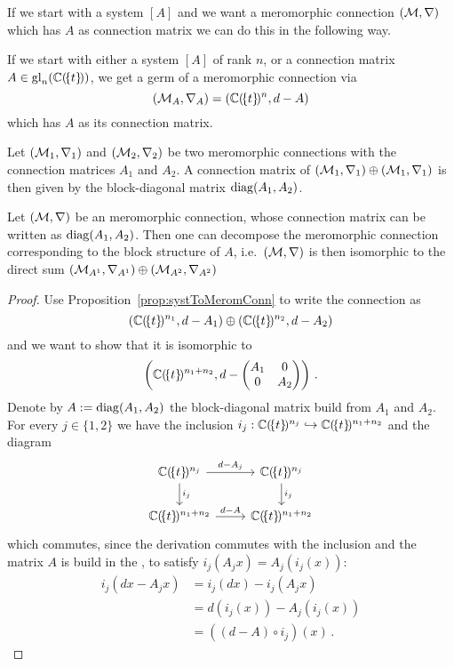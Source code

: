 If we start with a system $[A]$ and we want a meromorphic connection
$(\mathcal{M},\nabla)$ which has $A$ as connection matrix we can do this in the
following way.
\begin{prop}\label{prop:systToMeromConn}
  If we start with either a system $[A]$ of rank $n$, or a connection matrix
  $A\in\operatorname{gl}_n(\mathbb{C}(\!\{t\}\!))$, we get a germ of a meromorphic connection via
  \[
    (\mathcal{M}_A,\nabla_A)=(\mathbb{C}(\!\{t\}\!)^n,d-A)
  \]
  which has $A$ as its connection matrix.
\end{prop}

\begin{prop}\label{prop:MatOfSumOfMerCon}
  Let $(\mathcal{M}_1,\nabla_1)$ and $(\mathcal{M}_2,\nabla_2)$ be two meromorphic
  connections
  with the connection matrices $A_1$ and $A_2$.
  A connection matrix of $(\mathcal{M}_1,\nabla_1)\oplus(\mathcal{M}_1,\nabla_1)$ is then
  given
  by the block-diagonal matrix $\operatorname{diag}(A_1,A_2)$.
  \begin{s-cor}\label{cor:MatOfSumOfMerCon}
    Let $(\mathcal{M},\nabla)$ be an meromorphic connection, whose connection matrix
    can be written as $\operatorname{diag}(A_1,A_2)$.
    Then one can decompose the meromorphic connection corresponding to the block
    structure of $A$, i.e.\ $(\mathcal{M},\nabla)$ is then isomorphic to the direct sum
    $(\mathcal{M}_{A^1},\nabla_{A^1})\oplus(\mathcal{M}_{A^2},\nabla_{A^2})$
  \end{s-cor}
\end{prop}
\begin{proof}
  Use Proposition~\ref{prop:systToMeromConn} to write the connection as
  \[
    (\mathbb{C}(\!\{t\}\!)^{n_1},d-A_1)\oplus(\mathbb{C}(\!\{t\}\!)^{n_2},d-A_2)
  \]
  and we want to show that it is isomorphic to
  \[
    \left(\mathbb{C}(\!\{t\}\!)^{n_1+n_2},d-
    \begin{pmatrix} A_1 & 0 \\0 & A_2 \end{pmatrix}\right) \,.
  \]
  Denote by $A:=\operatorname{diag}(A_1,A_2)$ the block-diagonal matrix build from $A_1$ and
  $A_2$.
  For every $j\in\{1,2\}$ we have the inclusion
  $i_j:\mathbb{C}(\!\{t\}\!)^{n_j}\hookrightarrow\mathbb{C}(\!\{t\}\!)^{n_1+n_2}$ and the
  diagram
  \[ \begin{tikzcd}
      \C(\!\{t\}\!)^{n_j} \rar{d-A_j}\dar{i_j} & \C(\!\{t\}\!)^{n_j} \dar{i_j}
    \\\C(\!\{t\}\!)^{n_1+n_2} \rar{d-A} & \C(\!\{t\}\!)^{n_1+n_2}
  \end{tikzcd} \]
  which commutes, since the derivation commutes with the inclusion and the
  matrix $A$ is build in the , to satisfy
  $i_j(A_jx)=A_j(i_j(x))$:
  \begin{align*}
    i_j(dx-A_jx) &= i_j(dx)-i_j(A_jx)
    \\&=d(i_j(x))-A_j(i_j(x))
    \\&=((d-A)\circ i_j)(x) \,.
  \end{align*}
\end{proof}

